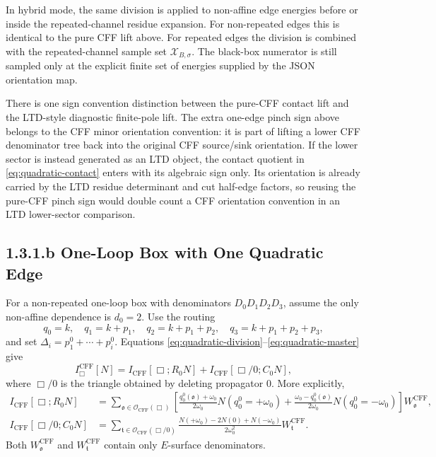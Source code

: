 \documentclass[11pt,a4paper]{report}
\newcommand{\CFF}{\operatorname{CFF}}
\newcommand{\Orient}{\mathcal O}
\newcommand{\Samples}{\mathcal X}
\begin{document}
In hybrid mode, the same division is applied to non-affine edge energies before
or inside the repeated-channel residue expansion.  For non-repeated edges this
is identical to the pure CFF lift above.  For repeated edges the division is
combined with the repeated-channel sample set
\(\Samples_{B,\sigma}\).  The black-box numerator is still sampled only at the
explicit finite set of energies supplied by the JSON orientation map.

There is one sign convention distinction between the pure-CFF contact lift and
the LTD-style diagnostic finite-pole lift.  The extra one-edge pinch sign above
belongs to the CFF minor orientation convention: it is part of lifting a lower
CFF denominator tree back into the original CFF source/sink orientation.  If the
lower sector is instead generated as an LTD object, the contact quotient in
\eqref{eq:quadratic-contact} enters with its algebraic sign only.  Its
orientation is already carried by the LTD residue determinant and cut
half-edge factors, so reusing the pure-CFF pinch sign would double count a CFF
orientation convention in an LTD lower-sector comparison.

\subsection*{1.3.1.b One-Loop Box with One Quadratic Edge}

For a non-repeated one-loop box with denominators \(D_0D_1D_2D_3\), assume the
only non-affine dependence is \(d_0=2\).  Use the routing
\[
  q_0=k,\quad q_1=k+p_1,\quad q_2=k+p_1+p_2,\quad
  q_3=k+p_1+p_2+p_3,
\]
and set \(\Delta_i=p_1^0+\cdots+p_i^0\).  Equations
\eqref{eq:quadratic-division}--\eqref{eq:quadratic-master} give
\begin{equation}
  I_{\Box}^{\CFF}[N]
  =
  I_{\CFF}[\Box;R_0N]
  +
  I_{\CFF}[\Box/0;C_0N],
  \label{eq:box-quadratic}
\end{equation}
where \(\Box/0\) is the triangle obtained by deleting propagator \(0\).  More
explicitly,
\begin{align}
  I_{\CFF}[\Box;R_0N]
  &=
  \sum_{\mathfrak o\in\Orient_{\CFF}(\Box)}
  \left[
  \frac{q_0^0(\mathfrak o)+\omega_0}{2\omega_0}N(q_0^0=+\omega_0)
  +
  \frac{\omega_0-q_0^0(\mathfrak o)}{2\omega_0}N(q_0^0=-\omega_0)
  \right]
  W_{\mathfrak o}^{\CFF},\\
  I_{\CFF}[\Box/0;C_0N]
  &=
  \sum_{\mathfrak t\in\Orient_{\CFF}(\Box/0)}
  \frac{
    N(+\omega_0)-2N(0)+N(-\omega_0)
  }{2\omega_0^2}
  W_{\mathfrak t}^{\CFF}.
\end{align}
Both \(W_{\mathfrak o}^{\CFF}\) and \(W_{\mathfrak t}^{\CFF}\) contain only
\(E\)-surface denominators.
\end{document}
